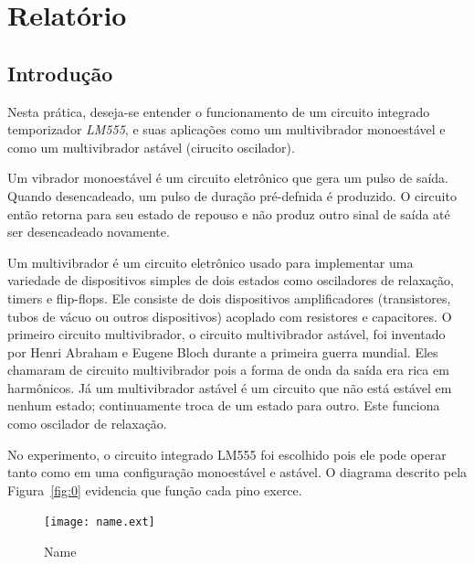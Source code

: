\documentclass[12pt,a4paper]{article}
\begin{document}
\setcounter{figure}{2}
\setcounter{section}{3}
\setcounter{page}{4}
\section{Relatório}
\subsection{Introdução}

Nesta prática, deseja-se entender o funcionamento de um circuito integrado temporizador \emph{LM555}, e suas aplicações como um multivibrador monoestável e como um multivibrador astável (cirucito oscilador). 

Um vibrador monoestável é um circuito eletrônico que gera um pulso de saída. Quando desencadeado, um pulso de duração pré-defnida é produzido.
O circuito então retorna para seu estado de repouso e não produz outro sinal de saída até ser desencadeado novamente.

Um multivibrador é um circuito eletrônico usado para implementar uma variedade de dispositivos simples de dois estados como osciladores de relaxação, timers e flip-flops.
Ele consiste de dois dispositivos amplificadores (transistores, tubos de vácuo ou outros dispositivos) acoplado com resistores e capacitores.
O primeiro circuito multivibrador, o circuito multivibrador astável, foi inventado por Henri Abraham e Eugene Bloch durante a primeira guerra mundial. 
Eles chamaram de circuito multivibrador pois a forma de onda da saída era rica em harmônicos. 
Já um multivibrador astável é um circuito que não está estável em nenhum estado; continuamente troca de um estado para outro. Este funciona como oscilador de relaxação.

No experimento, o circuito integrado LM555 foi escolhido pois ele pode operar tanto como em uma configuração monoestável e astável. O diagrama descrito pela Figura~\ref{fig:0} evidencia que função cada pino exerce.

\begin{figure}[htpb]
  \centering
  \texttt{[image: name.ext]}
  \caption{Name}
  \label{fig:name}
\end{figure}
\end{document}
